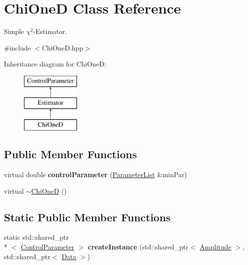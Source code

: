 \hypertarget{class_chi_one_d}{\section{Chi\-One\-D Class Reference}
\label{class_chi_one_d}
}


Simple $\chi^{2}$-\/\-Estimator.  




{\ttfamily \#include $<$Chi\-One\-D.\-hpp$>$}

Inheritance diagram for Chi\-One\-D\-:\begin{figure}[H]
\begin{center}
\leavevmode
\includegraphics[height=3.000000cm]{class_chi_one_d}
\end{center}
\end{figure}
\subsection*{Public Member Functions}
\begin{DoxyCompactItemize}
\item 
\hypertarget{class_chi_one_d_a01aed70ef28801d04721b8c5068faa15}{virtual double {\bfseries control\-Parameter} (\hyperlink{class_parameter_list}{Parameter\-List} \&min\-Par)}\label{class_chi_one_d_a01aed70ef28801d04721b8c5068faa15}

\item 
virtual \hyperlink{class_chi_one_d_a3e6fd195228f39afb011928f22db5f6e}{$\sim$\-Chi\-One\-D} ()
\end{DoxyCompactItemize}
\subsection*{Static Public Member Functions}
\begin{DoxyCompactItemize}
\item 
\hypertarget{class_chi_one_d_a86bfdd98afdd2fb5b8c95354cd362988}{static std\-::shared\-\_\-ptr\\*
$<$ \hyperlink{class_control_parameter}{Control\-Parameter} $>$ {\bfseries create\-Instance} (std\-::shared\-\_\-ptr$<$ \hyperlink{class_amplitude}{Amplitude} $>$, std\-::shared\-\_\-ptr$<$ \hyperlink{class_data}{Data} $>$)}\label{class_chi_one_d_a86bfdd98afdd2fb5b8c95354cd362988}

\end{DoxyCompactItemize}

